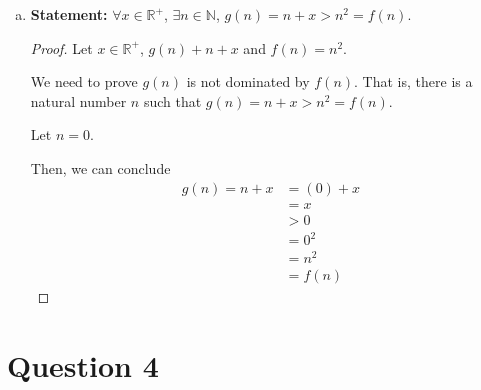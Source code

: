 \documentclass[12pt]{article}
\begin{document}
\begin{enumerate}[a.]
\begin{proof}
    \end{proof}

    \item

    \textbf{Statement:} $\forall x \in \mathbb{R}^{+}$, $\exists n \in \mathbb{N}$,
    $g(n) = n + x > n^2 = f(n)$.

    \begin{proof}
        Let $x \in \mathbb{R}^{+}$, $g(n) + n + x$ and $f(n) = n^2$.

        \bigskip

        We need to prove $g(n)$ is not dominated by $f(n)$. That is, there is a natural
        number $n$ such that $g(n) = n + x > n^2 = f(n)$.

        \bigskip

        Let $n = 0$.

        \bigskip

        Then, we can conclude
        \setcounter{equation}{0}
        \begin{align}
            g(n) = n + x &= (0) + x\\
            &= x\\
            &> 0\\
            &= 0^2\\
            &= n^2\\
            &= f(n)
        \end{align}
    \end{proof}

\end{enumerate}

\section*{Question 4}
\end{document}
